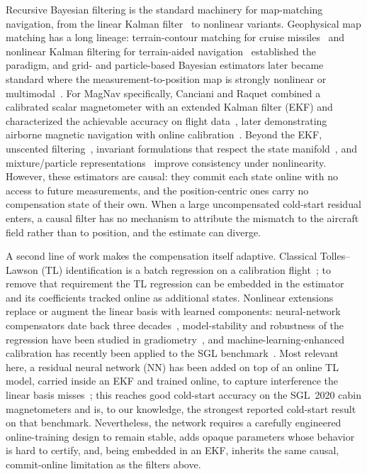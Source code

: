 \documentclass{IEEEtaes}
\begin{document}
Recursive Bayesian filtering is the standard machinery for map-matching
navigation, from the linear Kalman filter~\cite{kalman1960} to nonlinear variants.
Geophysical map matching has a long lineage: terrain-contour matching for cruise
missiles~\cite{golden1980} and nonlinear Kalman filtering for terrain-aided
navigation~\cite{hostetler1983} established the paradigm, and grid- and
particle-based Bayesian estimators later became standard where the
measurement-to-position map is strongly nonlinear or
multimodal~\cite{bergman1999,gustafsson2002,anonsen2006,nordlund2009}. For MagNav
specifically, Canciani and Raquet combined a calibrated scalar magnetometer with an
extended Kalman filter (EKF) and characterized the achievable accuracy on flight
data~\cite{canciani2016,canciani2017}, later demonstrating airborne magnetic
navigation with online calibration~\cite{canciani2020}. Beyond the EKF, unscented
filtering~\cite{julier2004}, invariant formulations that respect the state
manifold~\cite{barrau2017}, and mixture/particle representations~\cite{barshalom2001}
improve consistency under nonlinearity. However, these estimators are causal:
they commit each state online with no access to future measurements, and the
position-centric ones carry no compensation state of their own. When a large
uncompensated cold-start residual enters, a causal filter has no mechanism to
attribute the mismatch to the aircraft field rather than to position, and the
estimate can diverge.

A second line of work makes the compensation itself adaptive. Classical
Tolles--Lawson (TL) identification is a batch regression on a calibration
flight~\cite{tolles1950,leliak1961,bickel1979}; to remove that requirement the TL
regression can be embedded in the estimator and its coefficients tracked online as
additional states. Nonlinear extensions replace or augment the linear basis with
learned components: neural-network compensators date back three
decades~\cite{williams1993}, model-stability and robustness of the regression have
been studied in gradiometry~\cite{noriega2015}, and machine-learning-enhanced
calibration has recently been applied to the SGL benchmark~\cite{gnadt2022}. Most
relevant here, a residual neural network (NN) has been added on top of an online TL
model, carried inside an EKF and trained online, to capture interference the linear
basis misses~\cite{hager2026}; this reaches good cold-start accuracy on the SGL~2020
cabin magnetometers and is, to our knowledge, the strongest reported cold-start
result on that benchmark. Nevertheless, the network requires a carefully
engineered online-training design to remain stable, adds opaque parameters whose
behavior is hard to certify, and, being embedded in an EKF, inherits the same
causal, commit-online limitation as the filters above.
\end{document}
